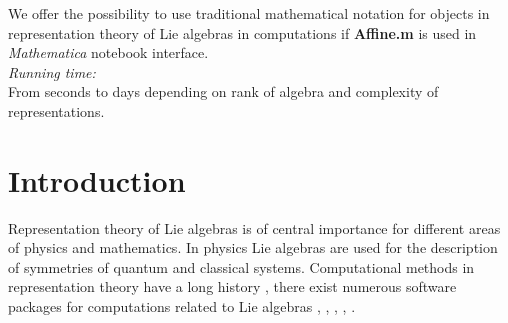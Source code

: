 \documentclass[preprint,12pt]{elsarticle}
\begin{document}
\begin{small}
We offer the possibility to use traditional mathematical notation for objects in representation theory of Lie algebras in computations if {\bf Affine.m} is used in {\it Mathematica} notebook interface.
   \\
{\em Running time:}\\
From seconds to days depending on rank of algebra and complexity of representations.
   \\

\end{small}


\section{Introduction}
\label{intro}

Representation theory of Lie algebras is of central importance for different areas of physics and mathematics. In physics Lie algebras are used for the description of symmetries of quantum and classical systems. Computational methods in representation theory have a long history \cite{belinfante1989survey}, there exist numerous software packages for computations related to Lie algebras \cite{simplie}, \cite{vanleeuwen1994lsp}, \cite{stembridge1995mps,coxweyl}, \cite{fischbacher2002ilp}, \cite{Fuchs:1996dd}.
\end{document}
